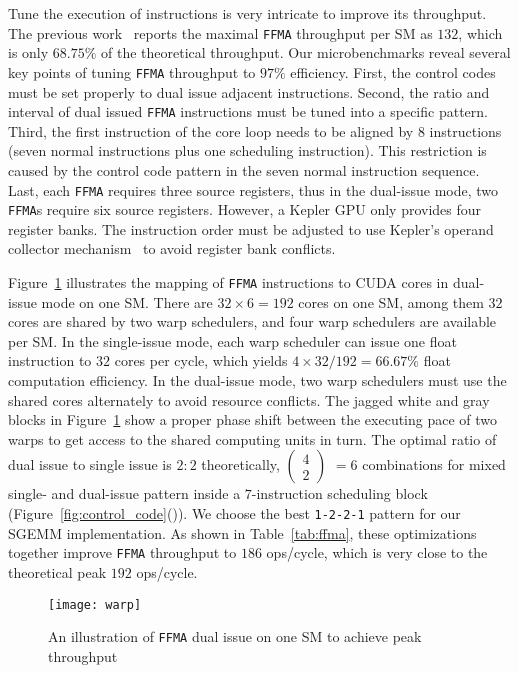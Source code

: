 Tune the execution of instructions is very intricate to improve its throughput. 
The previous work~\cite{lai} reports the maximal {\tt FFMA} throughput per SM as $132$, which is only $68.75\%$ of the theoretical throughput. 
Our microbenchmarks reveal several key points of tuning {\tt FFMA} throughput to $97\%$ efficiency.
First, the control codes must be set properly to dual issue adjacent instructions. 
Second, the ratio and interval of dual issued {\tt FFMA} instructions must be tuned into a specific pattern.
Third, the first instruction of the core loop needs to be aligned by 8 instructions (seven
normal instructions plus one scheduling instruction). This restriction
is caused by the control code pattern in the seven normal instruction sequence.
Last, each {\tt FFMA} requires three source registers, thus in the dual-issue mode, two {\tt FFMA}s require six source registers.
However, a Kepler GPU only provides four register banks.
The instruction order must be adjusted to use Kepler's operand collector mechanism~\cite{collector,tarjan2012policy} to avoid register bank conflicts. 

Figure~\ref{fig:warp} illustrates the mapping of {\tt FFMA} instructions to
CUDA cores in dual-issue mode on one SM. There are $32\times 6=192$ cores on
one SM, among them $32$ cores are shared by two warp schedulers, and four warp schedulers are available per SM. 
In the single-issue mode, each warp scheduler can issue one float instruction to $32$ cores per cycle, which yields $4\times32/192=66.67\%$ float computation efficiency. 
In the dual-issue mode, two warp schedulers must use the shared cores alternately to avoid resource conflicts.
The jagged white and gray blocks in Figure~\ref{fig:warp} show a proper phase shift between the executing pace of two warps to get access to the shared computing units in turn.
The optimal ratio of dual issue to single issue is $2:2$ theoretically, 
\( \begin{pmatrix} 4 \\ 2 \end{pmatrix} \) $=6$ combinations for mixed single- and dual-issue
pattern inside a $7$-instruction scheduling block (Figure~\ref{fig:control_code}()).
We choose the best {\tt 1-2-2-1} pattern for our SGEMM implementation.
As shown in Table~\ref{tab:ffma}, these optimizations together improve {\tt FFMA} throughput to $186$ ops/cycle, which is very close to the theoretical peak $192$ ops/cycle.
\begin{figure}[htbp]
\begin{center}
\texttt{[image: warp]}
    \caption{\small An illustration of {\tt FFMA} dual issue on one SM to achieve peak throughput}
\label{fig:warp}
\end{center}
\end{figure}

